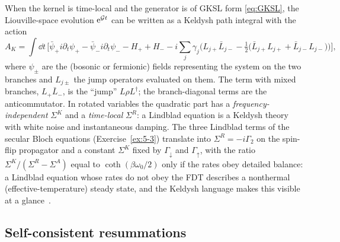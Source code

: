 When the kernel is time-local and the generator is of GKSL form \eqref{eq:GKSL}, the Liouville-space evolution $\mathrm{e}^{\mathcal{G} t}$ can be written as a Keldysh path integral with the action~\cite{Sieberer2016}
\begin{equation}
  A_K=\int\!\dd t\,\Big[\bar\psi_+i\partial_t\psi_+-\bar\psi_-i\partial_t\psi_--H_++H_-
  -i\sum_j\gamma_j\Big(L_{j+}\bar L_{j-}-\tfrac12\big(\bar L_{j+}L_{j+}+\bar L_{j-}L_{j-}\big)\Big)\Big],
  \label{eq:lindblad-action}
\end{equation}
where $\psi_\pm$ are the (bosonic or fermionic) fields representing the system on the two branches and $L_{j\pm}$ the jump operators evaluated on them.
The term with mixed branches, $L_+\bar L_-$, is the ``jump'' $L\rho L^\dagger$; the branch-diagonal terms are the anticommutator.
In rotated variables the quadratic part has a \emph{frequency-independent} $\Sigma^K$ and a \emph{time-local} $\Sigma^R$: a Lindblad equation is a Keldysh theory with white noise and instantaneous damping.
The three Lindblad terms of the secular Bloch equations (Exercise~\ref{ex:5-3}) translate into $\Sigma^R=-i\Gamma_2$ on the spin-flip propagator and a constant $\Sigma^K$ fixed by $\Gamma_\downarrow$ and $\Gamma_\uparrow$, with the ratio $\Sigma^K/(\Sigma^R-\Sigma^A)$ equal to $\coth(\beta\omega_0/2)$ only if the rates obey detailed balance: a Lindblad equation whose rates do not obey the FDT describes a nonthermal (effective-temperature) steady state, and the Keldysh language makes this visible at a glance~\cite[Sec.~4]{Sieberer2016}.

\subsection{Self-consistent resummations}

